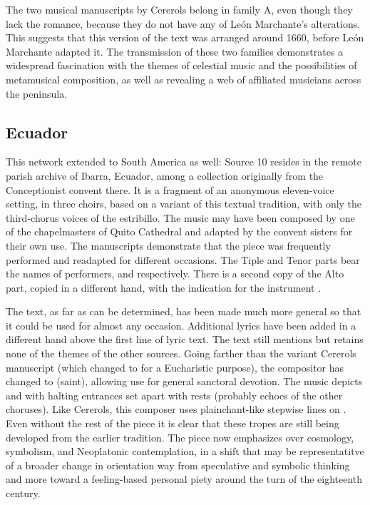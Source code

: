 The two musical manuscripts by Cererols belong in family A, even though they
lack the romance, because they do not have any of León Marchante's
alterations.
This suggests that this version of the text was arranged around 1660, before
León Marchante adapted it.
The transmission of these two families demonstrates a widespread fascination
with the themes of celestial music and the possibilities of metamusical
composition, as well as revealing a web of affiliated musicians across the
peninsula.

\subsection{Ecuador}

This network extended to South America as well: Source 10 resides in the remote
parish archive of Ibarra, Ecuador, among a collection originally from the
Conceptionist convent there.
It is a fragment of an anonymous eleven-voice setting, in three choirs, based on
a variant of this textual tradition, with only the third-chorus voices of the
estribillo.
The music may have been composed by one of the chapelmasters of Quito Cathedral
and adapted by the convent sisters for their own use.%
The manuscripts demonstrate that the piece was frequently performed and
readapted for different occasions.
The Tiple and Tenor parts bear the names of performers, 
and  respectively.
There is a second copy of the Alto part, copied in a different hand, with the
indication for the instrument . %


The text, as far as can be determined, has been made much more general so that
it could be used for almost any occasion.
Additional lyrics have been added in a different hand above the first line of
lyric text. %
The text still mentions  but retains none of the themes of the
other sources.
Going farther than the variant Cererols manuscript (which changed 
to  for a Eucharistic purpose), the compositor has changed
 to  (saint), allowing use for general sanctoral
devotion.
The music depicts  and  with halting
entrances set apart with rests (probably echoes of the other choruses).
Like Cererols, this composer uses plainchant-like stepwise lines on .
Even without the rest of the piece it is clear that these tropes are still being
developed from the earlier tradition.
The piece now emphasizes  over cosmology, symbolism,
and Neoplatonic contemplation, in a shift that may be representatitve of a
broader change in orientation way from speculative and symbolic thinking and
more toward a feeling-based personal piety around the turn of the eighteenth
century.

